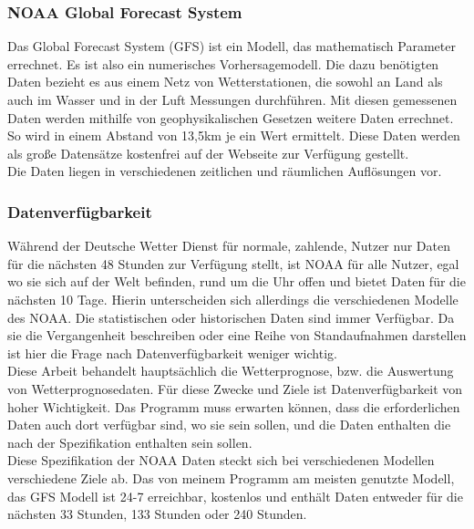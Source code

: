 \subsubsection*{NOAA Global Forecast System} %
Das Global Forecast System (GFS) ist ein Modell, das mathematisch Parameter errechnet.
Es ist also ein numerisches Vorhersagemodell.
Die dazu benötigten Daten bezieht es aus einem Netz von Wetterstationen,
die sowohl an Land als auch im Wasser und in der Luft Messungen durchführen.
Mit diesen gemessenen Daten werden mithilfe von geophysikalischen Gesetzen weitere Daten errechnet.
So wird in einem Abstand von 13,5km je ein Wert ermittelt.
Diese Daten werden als große Datensätze kostenfrei auf
der Webseite  \cite{ncep} zur Verfügung gestellt.\\
Die Daten liegen in verschiedenen zeitlichen und räumlichen Auflösungen vor.

\subsubsection{Datenverfügbarkeit} %
Während der Deutsche Wetter Dienst für normale, zahlende, Nutzer nur Daten
für die nächsten 48 Stunden zur Verfügung stellt, ist NOAA für alle Nutzer,
egal wo sie sich auf der Welt befinden, rund um die Uhr offen und bietet Daten
für die nächsten 10 Tage. Hierin unterscheiden sich allerdings die verschiedenen
Modelle des NOAA. Die statistischen oder historischen Daten sind immer Verfügbar.
Da sie die Vergangenheit beschreiben oder eine Reihe von Standaufnahmen darstellen
ist hier die Frage nach Datenverfügbarkeit weniger wichtig.\\
Diese Arbeit behandelt hauptsächlich die Wetterprognose, bzw. die Auswertung
von Wetterprognosedaten. Für diese Zwecke und Ziele ist Datenverfügbarkeit von
hoher Wichtigkeit. Das Programm muss erwarten können,
dass die erforderlichen Daten auch
dort verfügbar sind, wo sie sein sollen,
und die Daten enthalten die nach der
Spezifikation enthalten sein sollen.\\
Diese Spezifikation der NOAA Daten steckt sich bei verschiedenen Modellen
verschiedene Ziele ab. Das von meinem Programm am meisten genutzte Modell,
das GFS Modell ist 24-7 erreichbar,
kostenlos und enthält Daten entweder für die nächsten 33 Stunden,
133 Stunden oder 240 Stunden.

